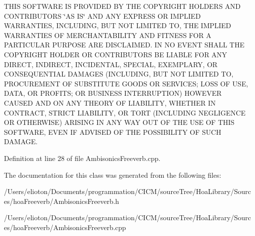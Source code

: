 T\-H\-I\-S S\-O\-F\-T\-W\-A\-R\-E I\-S P\-R\-O\-V\-I\-D\-E\-D B\-Y T\-H\-E C\-O\-P\-Y\-R\-I\-G\-H\-T H\-O\-L\-D\-E\-R\-S A\-N\-D C\-O\-N\-T\-R\-I\-B\-U\-T\-O\-R\-S \char`\"{}\-A\-S I\-S\char`\"{} A\-N\-D A\-N\-Y E\-X\-P\-R\-E\-S\-S O\-R I\-M\-P\-L\-I\-E\-D W\-A\-R\-R\-A\-N\-T\-I\-E\-S, I\-N\-C\-L\-U\-D\-I\-N\-G, B\-U\-T N\-O\-T L\-I\-M\-I\-T\-E\-D T\-O, T\-H\-E I\-M\-P\-L\-I\-E\-D W\-A\-R\-R\-A\-N\-T\-I\-E\-S O\-F M\-E\-R\-C\-H\-A\-N\-T\-A\-B\-I\-L\-I\-T\-Y A\-N\-D F\-I\-T\-N\-E\-S\-S F\-O\-R A P\-A\-R\-T\-I\-C\-U\-L\-A\-R P\-U\-R\-P\-O\-S\-E A\-R\-E D\-I\-S\-C\-L\-A\-I\-M\-E\-D. I\-N N\-O E\-V\-E\-N\-T S\-H\-A\-L\-L T\-H\-E C\-O\-P\-Y\-R\-I\-G\-H\-T H\-O\-L\-D\-E\-R O\-R C\-O\-N\-T\-R\-I\-B\-U\-T\-O\-R\-S B\-E L\-I\-A\-B\-L\-E F\-O\-R A\-N\-Y D\-I\-R\-E\-C\-T, I\-N\-D\-I\-R\-E\-C\-T, I\-N\-C\-I\-D\-E\-N\-T\-A\-L, S\-P\-E\-C\-I\-A\-L, E\-X\-E\-M\-P\-L\-A\-R\-Y, O\-R C\-O\-N\-S\-E\-Q\-U\-E\-N\-T\-I\-A\-L D\-A\-M\-A\-G\-E\-S (I\-N\-C\-L\-U\-D\-I\-N\-G, B\-U\-T N\-O\-T L\-I\-M\-I\-T\-E\-D T\-O, P\-R\-O\-C\-U\-R\-E\-M\-E\-N\-T O\-F S\-U\-B\-S\-T\-I\-T\-U\-T\-E G\-O\-O\-D\-S O\-R S\-E\-R\-V\-I\-C\-E\-S; L\-O\-S\-S O\-F U\-S\-E, D\-A\-T\-A, O\-R P\-R\-O\-F\-I\-T\-S; O\-R B\-U\-S\-I\-N\-E\-S\-S I\-N\-T\-E\-R\-R\-U\-P\-T\-I\-O\-N) H\-O\-W\-E\-V\-E\-R C\-A\-U\-S\-E\-D A\-N\-D O\-N A\-N\-Y T\-H\-E\-O\-R\-Y O\-F L\-I\-A\-B\-I\-L\-I\-T\-Y, W\-H\-E\-T\-H\-E\-R I\-N C\-O\-N\-T\-R\-A\-C\-T, S\-T\-R\-I\-C\-T L\-I\-A\-B\-I\-L\-I\-T\-Y, O\-R T\-O\-R\-T (I\-N\-C\-L\-U\-D\-I\-N\-G N\-E\-G\-L\-I\-G\-E\-N\-C\-E O\-R O\-T\-H\-E\-R\-W\-I\-S\-E) A\-R\-I\-S\-I\-N\-G I\-N A\-N\-Y W\-A\-Y O\-U\-T O\-F T\-H\-E U\-S\-E O\-F T\-H\-I\-S S\-O\-F\-T\-W\-A\-R\-E, E\-V\-E\-N I\-F A\-D\-V\-I\-S\-E\-D O\-F T\-H\-E P\-O\-S\-S\-I\-B\-I\-L\-I\-T\-Y O\-F S\-U\-C\-H D\-A\-M\-A\-G\-E. 

Definition at line 28 of file Ambisonics\-Freeverb.\-cpp.



The documentation for this class was generated from the following files\-:\begin{DoxyCompactItemize}
\item 
/\-Users/elioton/\-Documents/programmation/\-C\-I\-C\-M/source\-Tree/\-Hoa\-Library/\-Sources/hoa\-Freeverb/Ambisonics\-Freeverb.\-h\item 
/\-Users/elioton/\-Documents/programmation/\-C\-I\-C\-M/source\-Tree/\-Hoa\-Library/\-Sources/hoa\-Freeverb/Ambisonics\-Freeverb.\-cpp\end{DoxyCompactItemize}
